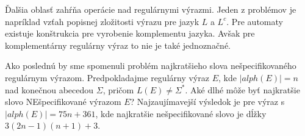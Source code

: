 Ďalšia oblasť zahŕňa operácie nad regulárnymi výrazmi. Jeden z problémov je napríklad vzťah popisnej zložitosti výrazu pre jazyk $L$ a $L^c$. Pre automaty existuje konštrukcia pre vyrobenie komplementu jazyka. Avšak pre komplementárny regulárny výraz to nie je také jednoznačné.

Ako poslednú by sme spomenuli problém najkratšieho slova nešpecifikovaného re\-gu\-lár\-nym výrazom. Predpokladajme regulárny výraz $E$, kde $|alph(E)|=n$ nad konečnou abecedou $\Sigma$, pričom $L(E)\neq \Sigma^*$. Aké dlhé môže byť najkratšie slovo NEšpecifikované výrazom $E$? Najzaujímavejší výsledok je pre výraz s $|alph(E)| = 75n + 361$, kde naj\-krat\-šie nešpecifikované slovo je dĺžky $3(2 n - 1)(n + 1) + 3$.
